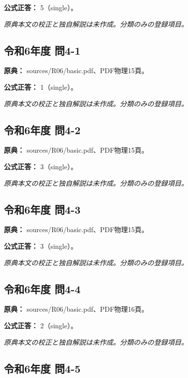 \textbf{公式正答：} 5（single）。

\par\textit{原典本文の校正と独自解説は未作成。分類のみの登録項目。}

\subsection{令和6年度 問4-1}
\label{q:r06-reg-basic-4-1}

\noindent\textbf{原典：} sources/R06/basic.pdf、PDF物理15頁。

\textbf{公式正答：} 1（single）。

\par\textit{原典本文の校正と独自解説は未作成。分類のみの登録項目。}

\subsection{令和6年度 問4-2}
\label{q:r06-reg-basic-4-2}

\noindent\textbf{原典：} sources/R06/basic.pdf、PDF物理15頁。

\textbf{公式正答：} 3（single）。

\par\textit{原典本文の校正と独自解説は未作成。分類のみの登録項目。}

\subsection{令和6年度 問4-3}
\label{q:r06-reg-basic-4-3}

\noindent\textbf{原典：} sources/R06/basic.pdf、PDF物理15頁。

\textbf{公式正答：} 3（single）。

\par\textit{原典本文の校正と独自解説は未作成。分類のみの登録項目。}

\subsection{令和6年度 問4-4}
\label{q:r06-reg-basic-4-4}

\noindent\textbf{原典：} sources/R06/basic.pdf、PDF物理16頁。

\textbf{公式正答：} 2（single）。

\par\textit{原典本文の校正と独自解説は未作成。分類のみの登録項目。}

\subsection{令和6年度 問4-5}
\label{q:r06-reg-basic-4-5}

